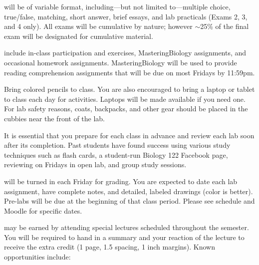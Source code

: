 \documentclass{tufte-handout}
\begin{document}
\begin{fullwidth}




 will be of variable format, including---but not limited to---multiple choice, true/false, matching, short answer, brief essays, and lab practicals (Exams 2, 3, and 4 only). All exams will be cumulative by nature; however $\sim$25\% of the final exam will be designated for cumulative material. 

 include in-class participation and exercises, MasteringBiology assignments, and occasional homework assignments. MasteringBiology will be used to provide reading comprehension assignments that will be due on most Fridays by 11:59pm. 

Bring colored pencils to class. You are also encouraged to bring a laptop or tablet to class each day for activities. Laptops will be made available if you need one. For lab safety reasons, coats, backpacks, and other gear should be placed in the cubbies near the front of the lab. 

It is essential that you prepare for each class in advance and review each lab soon after its completion. Past students have found success using various study techniques such as flash cards, a student-run Biology 122 Facebook page, reviewing on Fridays in open lab, and group study sessions. 

 will be turned in each Friday for grading. You are expected to date each lab assignment, have complete notes, and detailed, labeled drawings (color is better).  {Pre-labs} will be due at the beginning of that class period. Please see schedule and Moodle for specific dates.

 may be earned by attending special lectures scheduled throughout the semester.  You will be required to hand in a summary and your reaction of the lecture to receive the extra credit (1 page, 1.5 spacing, 1 inch margins). Known opportunities include:


\end{fullwidth}
\end{document}
